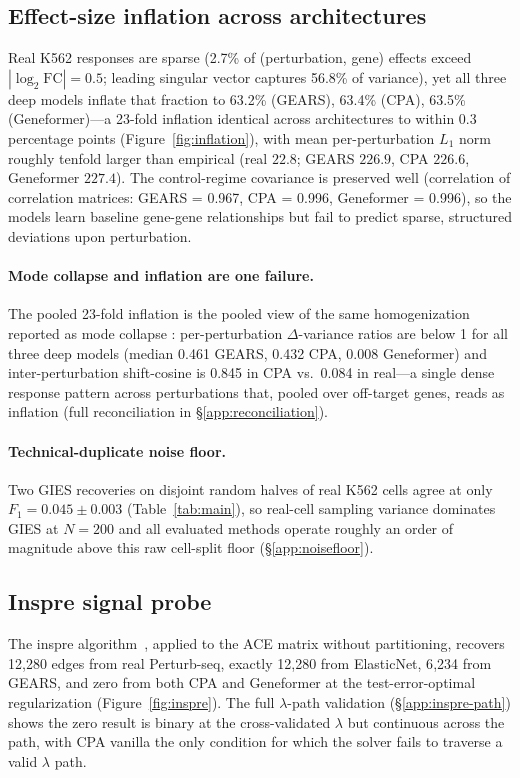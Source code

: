 \documentclass{article}
\theoremstyle{plain}
\theoremstyle{definition}
\theoremstyle{remark}
\begin{document}
\subsection{Effect-size inflation across architectures}
Real K562 responses are sparse (2.7\% of (perturbation, gene) effects exceed $|\log_2 \mathrm{FC}| = 0.5$; leading singular vector captures 56.8\% of variance), yet all three deep models inflate that fraction to 63.2\% (GEARS), 63.4\% (CPA), 63.5\% (Geneformer)---a 23-fold inflation identical across architectures to within 0.3 percentage points (Figure~\ref{fig:inflation}), with mean per-perturbation $L_1$ norm roughly tenfold larger than empirical (real $22.8$; GEARS $226.9$, CPA $226.6$, Geneformer $227.4$). The control-regime covariance is preserved well (correlation of correlation matrices: GEARS = 0.967, CPA = 0.996, Geneformer = 0.996), so the models learn baseline gene-gene relationships but fail to predict sparse, structured deviations upon perturbation.

\paragraph{Mode collapse and inflation are one failure.} The pooled 23-fold inflation is the pooled view of the same homogenization reported as mode collapse \citep{mejia2025diversity,ahlmanneltze2025}: per-perturbation $\Delta$-variance ratios are below 1 for all three deep models (median 0.461 GEARS, 0.432 CPA, 0.008 Geneformer) and inter-perturbation shift-cosine is 0.845 in CPA vs.\ 0.084 in real---a single dense response pattern across perturbations that, pooled over off-target genes, reads as inflation (full reconciliation in \S\ref{app:reconciliation}).

\paragraph{Technical-duplicate noise floor.} Two GIES recoveries on disjoint random halves of real K562 cells agree at only $F_1 = 0.045 \pm 0.003$ (Table~\ref{tab:main}), so real-cell sampling variance dominates GIES at $N{=}200$ and all evaluated methods operate roughly an order of magnitude above this raw cell-split floor (\S\ref{app:noisefloor}).

\subsection{Inspre signal probe}
\label{sec:inspre-probe}
The inspre algorithm~\citep{brown2025inspre}, applied to the ACE matrix without partitioning, recovers 12{,}280 edges from real Perturb-seq, exactly 12{,}280 from ElasticNet, 6{,}234 from GEARS, and zero from both CPA and Geneformer at the test-error-optimal regularization (Figure~\ref{fig:inspre}). The full $\lambda$-path validation (\S\ref{app:inspre-path}) shows the zero result is binary at the cross-validated $\lambda$ but continuous across the path, with CPA vanilla the only condition for which the solver fails to traverse a valid $\lambda$ path.
\end{document}
